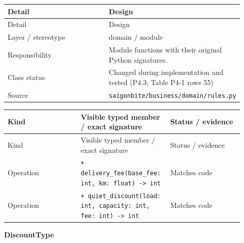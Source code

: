 \begin{longtable}{>{\raggedright\arraybackslash}p{0.4600\linewidth}>{\raggedright\arraybackslash}p{0.4600\linewidth}}
Detail & Design \\
\hline\endfirsthead
Detail & Design \\
\hline\endhead
Layer / stereotype & domain / \guillemotleft{}module\guillemotright{} \\
Responsibility & Module functions with their original Python signatures. \\
Class status & Changed during implementation and tested (P4.3; Table P4-1 rows 55) \\
Source & \texttt{saigonbite/\allowbreak{}business/\allowbreak{}domain/\allowbreak{}rules.\allowbreak{}py} \\
\end{longtable}
\begin{longtable}{>{\raggedright\arraybackslash}p{0.3067\linewidth}>{\raggedright\arraybackslash}p{0.3067\linewidth}>{\raggedright\arraybackslash}p{0.3067\linewidth}}
Kind & Visible typed member / exact signature & Status / evidence \\
\hline\endfirsthead
Kind & Visible typed member / exact signature & Status / evidence \\
\hline\endhead
Operation & \texttt{+ delivery\_\allowbreak{}fee(base\_\allowbreak{}fee: int, km: float) -\textgreater{} int} & Matches code \\
Operation & \texttt{+ quiet\_\allowbreak{}discount(load: int, capacity: int, fee: int) -\textgreater{} int} & Matches code \\
\end{longtable}
\textbf{DiscountType}

